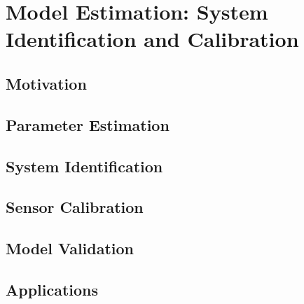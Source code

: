 \chapter{Model Estimation: System Identification and Calibration}

	\section{Motivation}

    \section{Parameter Estimation}

	\section{System Identification}

    \section{Sensor Calibration}

	\section{Model Validation}

    \section{Applications}
